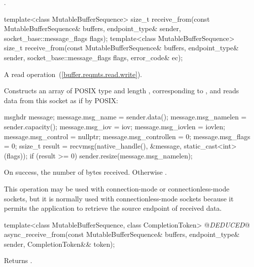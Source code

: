 \begin{itemdescr}
\pnum
\returns {}.
\end{itemdescr}

\begin{itemdecl}
template<class MutableBufferSequence>
  size_t receive_from(const MutableBufferSequence& buffers,
                      endpoint_type& sender,
                      socket_base::message_flags flags);
template<class MutableBufferSequence>
  size_t receive_from(const MutableBufferSequence& buffers,
                      endpoint_type& sender,
                      socket_base::message_flags flags,
                      error_code& ec);
\end{itemdecl}

\begin{itemdescr}
\pnum
A read operation~(\ref{buffer.reqmts.read.write}).

\pnum
\effects Constructs an array  of POSIX type  and length , corresponding to , and reads data from this socket as if by POSIX: 
\begin{codeblock}
msghdr message;
message.msg_name = sender.data();
message.msg_namelen = sender.capacity();
message.msg_iov = iov;
message.msg_iovlen = iovlen;
message.msg_control = nullptr;
message.msg_controllen = 0;
message.msg_flags = 0;
ssize_t result = recvmsg(native_handle(), &message, static_cast<int>(flags));
if (result >= 0)
  sender.resize(message.msg_namelen);
\end{codeblock}


\pnum
\returns On success, the number of bytes received. Otherwise .

\pnum
 \enternote This operation may be used with connection-mode or connectionless-mode sockets, but it is normally used with connectionless-mode sockets because it permits the application to retrieve the source endpoint of received data. \exitnote
\end{itemdescr}

\begin{itemdecl}
template<class MutableBufferSequence, class CompletionToken>
  @\textit{DEDUCED}@ async_receive_from(const MutableBufferSequence& buffers,
                             endpoint_type& sender,
                             CompletionToken&& token);
\end{itemdecl}

\begin{itemdescr}
\pnum
\effects Returns .
\end{itemdescr}


